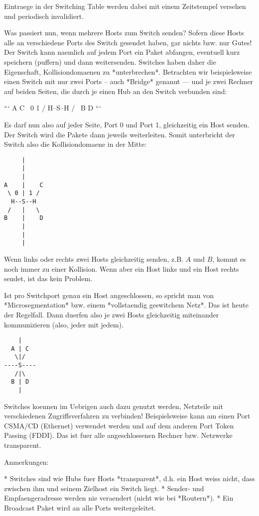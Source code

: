 Eintraege in der Switching Table werden dabei mit einem Zeitstempel versehen und
periodisch invalidiert.

Was passiert nun, wenn mehrere Hosts zum Switch senden? Sofern diese Hosts alle
an verschiedene Ports des Switch gesendet haben, gar nichts bzw. nur Gutes! Der
Switch kann naemlich auf jedem Port ein Paket abfangen, eventuell kurz speichern
(puffern) und dann weitersenden. Switches haben daher die Eigenschaft,
Kollisiondomaenen zu *unterbrechen*. Betrachten wir beispielsweise einen Switch
mit nur zwei Ports -- auch *Bridge* genannt --- und je zwei Rechner auf beiden
Seiten, die durch je einen Hub an den Switch verbunden sind:

```
A         C
 \ 0   1 /
  H--S--H
 /       \
B         D
```

Es darf nun also auf jeder Seite, Port 0 und Port 1, gleichzeitig ein Host
senden. Der Switch wird die Pakete dann jeweils weiterleiten. Somit unterbricht
der Switch also die Kollisiondomaene in der Mitte:

\begin{verbatim}
     |
     |
     |
A    |    C
 \ 0 | 1 /
  H--S--H
 /   |   \
B    |    D
     |
     |
	 |
\end{verbatim}

Wenn links oder rechts zwei Hosts gleichzeitig senden, z.B. $A$ und $B$, kommt
es noch immer zu einer Kollision. Wenn aber ein Host links und ein Host rechts
sendet, ist das kein Problem.

Ist pro Switchport genau ein Host angeschlossen, so spricht man von
*Microsegmentation* bzw. einem *vollstaendig geswitchem Netz*. Das ist heute der
Regelfall. Dann duerfen also je zwei Hosts gleichzeitig miteinander
kommunizieren (also, jeder mit jedem).

\begin{verbatim}
    |
  A | C
   \|/
----S----
   /|\
  B | D
    |
\end{verbatim}

Switches koennen im Uebrigen auch dazu genutzt werden, Netzteile mit
verschiedenen Zugriffsverfahren zu verbinden! Beispielsweise kann am einen Port
CSMA/CD (Ethernet) verwendet werden und auf dem anderen Port Token Passing
(FDDI). Das ist fuer alle angeschlossenen Rechner bzw. Netzwerke transparent.

Anmerkungen:

* Switches sind wie Hubs fuer Hosts *transparent*, d.h. ein Host weiss nicht,
  dass zwischen ihm und seinem Zielhost ein Switch liegt.
* Sender- und Empfaengeradresse werden nie veraendert (nicht wie bei *Routern*).
* Ein Broadcast Paket wird an alle Ports weitergeleitet.

